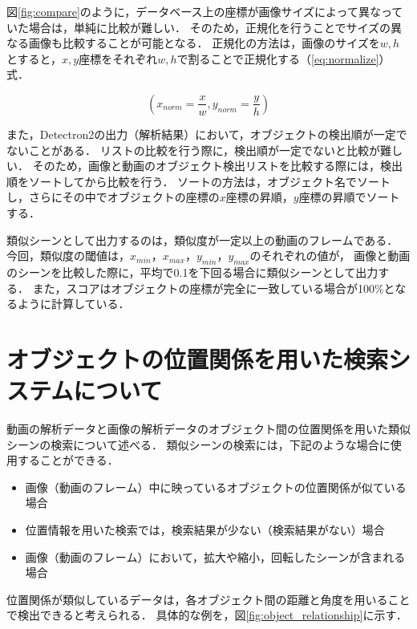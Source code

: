 \documentclass[a4j,12pt,dvipdfmx]{jreport}
\begin{document}
図\ref{fig:compare}のように，データベース上の座標が画像サイズによって異なっていた場合は，単純に比較が難しい．
そのため，正規化を行うことでサイズの異なる画像も比較することが可能となる．
正規化の方法は，画像のサイズを$w,h$とすると，$x,y$座標をそれぞれ$w,h$で割ることで正規化する（\ref{eq:normalize}）式．

\begin{equation}
  \label{eq:normalize}
  (x_{norm} = \frac{x}{w}, y_{norm} = \frac{y}{h})
\end{equation}

また，Detectron2の出力（解析結果）において，オブジェクトの検出順が一定でないことがある．
リストの比較を行う際に，検出順が一定でないと比較が難しい．
そのため，画像と動画のオブジェクト検出リストを比較する際には，検出順をソートしてから比較を行う．
ソートの方法は，オブジェクト名でソートし，さらにその中でオブジェクトの座標の$x$座標の昇順，$y$座標の昇順でソートする．

類似シーンとして出力するのは，類似度が一定以上の動画のフレームである．
今回，類似度の閾値は，$x_{min}$，$x_{max}$，$y_{min}$，$y_{max}$のそれぞれの値が，
画像と動画のシーンを比較した際に，平均で0.1を下回る場合に類似シーンとして出力する．
また，スコアはオブジェクトの座標が完全に一致している場合が100\%となるように計算している．

\section{オブジェクトの位置関係を用いた検索システムについて}\label{chap3-5}
\label{sec:search_relationship}
動画の解析データと画像の解析データのオブジェクト間の位置関係を用いた類似シーンの検索について述べる．
類似シーンの検索には，下記のような場合に使用することができる．

\begin{itemize}
  \item 画像（動画のフレーム）中に映っているオブジェクトの位置関係が似ている場合
  \item 位置情報を用いた検索では，検索結果が少ない（検索結果がない）場合
  \item 画像（動画のフレーム）において，拡大や縮小，回転したシーンが含まれる場合
\end{itemize}


位置関係が類似しているデータは，各オブジェクト間の距離と角度を用いることで検出できると考えられる．
具体的な例を，図\ref{fig:object_relationship}に示す．
\end{document}
